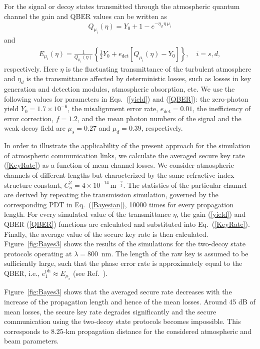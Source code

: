 \documentclass[aps,pra,twocolumn,a4paper,nofootinbib,preprintnumbers] {revtex4-1}
\begin{document}
      For the signal or decoy states transmitted through the atmospheric quantum channel the gain and QBER values can be written as
	      \begin{align}\label{yield}
	      Q_{\mu_i}(\eta)=Y_0+1-e^{-\eta_d\,\eta\, \mu_i}
	      \end{align}
      and
	      \begin{align}\label{QBER}
	      E_{\mu_i}(\eta)=\frac{1}{ Q_{\mu_i}(\eta)}\left\{\frac{1}{2} Y_0+e_{\mathrm{det}}\left[Q_{\mu_i}(\eta){-}Y_0\right]\right\},\quad i{=}s,d,
	      \end{align}
      respectively.
      Here $\eta$  is the fluctuating transmittance of the turbulent atmosphere and $\eta_d$ is the transmittance affected by deterministic losses, such as losses in key generation and detection modules, atmospheric absorption, etc.
      We use the following values for parameters in Eqs.~(\ref{yield}) and (\ref{QBER}): the zero-photon yield  $Y_0=1.7\times 10^{-6}$, the misalignment error rate, $e_{\mathrm{det}}{=}0.01$, the inefficiency of error correction, $f=1.2$, and the mean photon numbers of the signal and the  weak decoy field  are $\mu_s{=}0.27$ and $\mu_d{=}0.39$, respectively.

      In order to illustrate the applicability of the present approach for the simulation of atmospheric communication links, we calculate the averaged secure key rate (\ref{KeyRate}) as a function of mean channel losses.
      We consider  atmospheric channels of different lengths but characterized by the same  refractive index structure constant, $C_n^2{=}4{\times} 10^{-14}\,\text{m}^{-\frac{2}{3}}$.
      The statistics of the particular channel are derived by repeating the transmission simulation, governed by the corresponding PDT in Eq.~(\ref{Bayesian}), 10000 times for every propagation length.
      For every simulated value of the transmittance $\eta$, the gain (\ref{yield}) and QBER (\ref{QBER}) functions are calculated and substituted into Eq.~(\ref{KeyRate}).
      Finally, the  average value of the secure key rate is then calculated.
      Figure~\ref{fig:Bayes3} shows the results of the simulations for the two-decoy state protocols operating at  $\lambda{=}800$~nm.
      The length of the raw key is assumed to be sufficiently large, such that  the phase error rate is approximately equal to the QBER, i.e.,  $e_1^{\mathrm{ph}}{\approx}E_{\mu_{s}}$ (see Ref.~\cite{Fung}).

      Figure~\ref{fig:Bayes3}  shows that the averaged secure rate decreases with the increase of the propagation length and hence of the mean losses.
      Around 45 dB of mean losses, the secure key rate degrades significantly and the secure communication using the two-decoy state protocols becomes impossible.
      This corresponds to 8.25-km propagation distance for the considered atmospheric and beam parameters.
\end{document}
